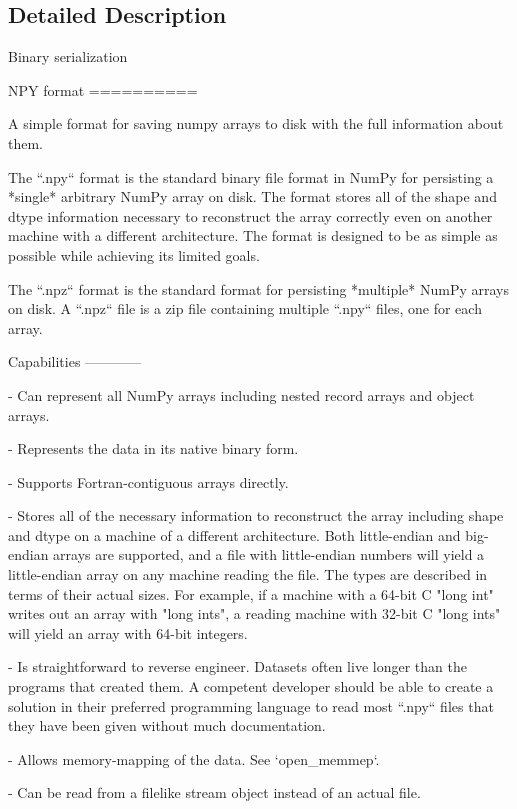 \subsection{Detailed Description}
\begin{DoxyVerb}Binary serialization

NPY format
==========

A simple format for saving numpy arrays to disk with the full
information about them.

The ``.npy`` format is the standard binary file format in NumPy for
persisting a *single* arbitrary NumPy array on disk. The format stores all
of the shape and dtype information necessary to reconstruct the array
correctly even on another machine with a different architecture.
The format is designed to be as simple as possible while achieving
its limited goals.

The ``.npz`` format is the standard format for persisting *multiple* NumPy
arrays on disk. A ``.npz`` file is a zip file containing multiple ``.npy``
files, one for each array.

Capabilities
------------

- Can represent all NumPy arrays including nested record arrays and
  object arrays.

- Represents the data in its native binary form.

- Supports Fortran-contiguous arrays directly.

- Stores all of the necessary information to reconstruct the array
  including shape and dtype on a machine of a different
  architecture.  Both little-endian and big-endian arrays are
  supported, and a file with little-endian numbers will yield
  a little-endian array on any machine reading the file. The
  types are described in terms of their actual sizes. For example,
  if a machine with a 64-bit C "long int" writes out an array with
  "long ints", a reading machine with 32-bit C "long ints" will yield
  an array with 64-bit integers.

- Is straightforward to reverse engineer. Datasets often live longer than
  the programs that created them. A competent developer should be
  able to create a solution in their preferred programming language to
  read most ``.npy`` files that they have been given without much
  documentation.

- Allows memory-mapping of the data. See `open_memmep`.

- Can be read from a filelike stream object instead of an actual file.


\end{DoxyVerb}
